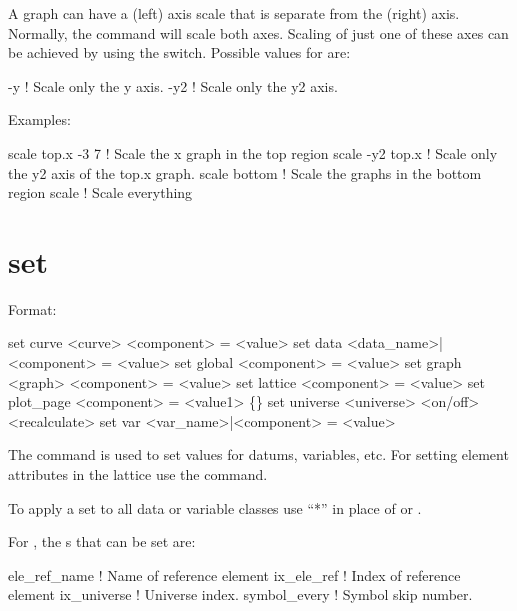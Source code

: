 A graph can have a  (left) axis scale that is separate from the  (right) 
axis. Normally, the  command will scale both axes.  Scaling of just one of these
axes can be achieved by using the  switch. Possible values for  are:
\begin{example}
  -y                 ! Scale only the y axis.
  -y2                ! Scale only the y2 axis.
\end{example}

Examples:
\begin{example}
  scale top.x -3  7  ! Scale the x graph in the top region
  scale -y2 top.x    ! Scale only the y2 axis of the top.x graph.
  scale bottom       ! Scale the graphs in the bottom region
  scale              ! Scale everything
\end{example}


\section{set}
\label{s:set}

Format:
\begin{example}
  set curve <curve> <component> = <value>
  set data <data_name>|<component> = <value>
  set global <component> = <value>
  set graph <graph> <component> = <value>
  set lattice <component> = <value>
  set plot_page <component> = <value1> \{<value2>\}
  set universe <universe> <on/off> <recalculate>
  set var <var_name>|<component> = <value>
\end{example}

\vskip 0.2in 
The  command is used to set values for datums,
variables, etc.  For setting element attributes in the 
lattice use the  command.

To apply a set to all data or variable classes use ``*''
in place of  or .

For , the s that can be set are:
\begin{example}
  ele_ref_name   ! Name of reference element
  ix_ele_ref     ! Index of reference element
  ix_universe    ! Universe index.
  symbol_every   ! Symbol skip number.
\end{example}

